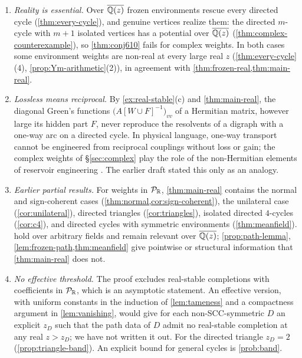 \begin{remark}\label{rem:scope}
\begin{enumerate}[label=(\arabic*)]
\item \emph{Reality is essential.} Over $\overline{\mathbb{Q}(z)}$ frozen environments rescue every directed cycle (\cref{thm:every-cycle}), and genuine vertices realize them: the directed $m$-cycle with $m+1$ isolated vertices has a potential over $\overline{\mathbb{Q}(z)}$ (\cref{thm:complex-counterexample}), so \cref{thm:conj610} fails for complex weights. In both cases some environment weights are non-real at every large real $z$ (\cref{thm:every-cycle}(4), \cref{prop:Ym-arithmetic}(2)), in agreement with \cref{thm:frozen-real,thm:main-real}.
\item \emph{Lossless means reciprocal.} By \cref{ex:real-stable}(c) and \cref{thm:main-real}, the diagonal Green's functions $\bigl(A[W\cup F]^{-1}\bigr)_{vv}$ of a Hermitian matrix, however large its hidden part $F$, never reproduce the resolvents of a digraph with a one-way arc on a directed cycle. In physical language, one-way transport cannot be engineered from reciprocal couplings without loss or gain; the complex weights of \S\ref{sec:complex} play the role of the non-Hermitian elements of reservoir engineering \cite{MetelmannClerk}. The earlier draft stated this only as an analogy.
\item \emph{Earlier partial results.} For weights in $\mathcal{P}_{\mathbb{R}}$, \cref{thm:main-real} contains the normal and sign-coherent cases (\cref{thm:normal,cor:sign-coherent}), the unilateral case (\cref{cor:unilateral}), directed triangles (\cref{cor:triangles}), isolated directed $4$-cycles (\cref{cor:c4}), and directed cycles with symmetric environments (\cref{thm:meanfield}).  hold over arbitrary fields and remain relevant over $\overline{\mathbb{Q}(z)}$; \cref{prop:path-lemma}, \cref{lem:frozen-path,thm:meanfield} give pointwise or structural information that \cref{thm:main-real} does not.
\item \emph{No effective threshold.} The proof excludes real-stable completions with coefficients in $\mathcal{P}_{\mathbb{R}}$, which is an asymptotic statement. An effective version, with uniform constants in the induction of \cref{lem:tameness} and a compactness argument in \cref{lem:vanishing}, would give for each non-SCC-symmetric $D$ an explicit $z_D$ such that the path data of $D$ admit no real-stable completion at any real $z>z_D$; we have not written it out. For the directed triangle $z_D=2$ (\cref{prop:triangle-band}). An explicit bound for general cycles is \cref{prob:band}.
\end{enumerate}
\end{remark}
